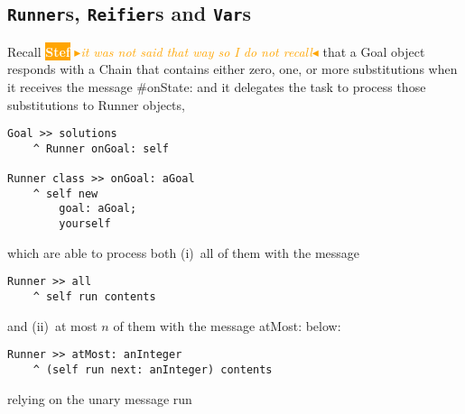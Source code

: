 \documentclass[a4paper,11pt]{article}
\newcommand{\nb}[3]{
		{\colorbox{#2}{\bfseries\sffamily\scriptsize\textcolor{white}{#1}}}
		{\textcolor{#2}{\sf\small$\blacktriangleright$\textit{#3}$\blacktriangleleft$}}}
\newcommand{\nb}[3]{}
\newcommand{\sd}[1]{\nb{Stef}{orange}{#1}}
\newcommand{\ct}[1]{{\textsf{#1}}\xspace}
\begin{document}
\subsection{\texttt{Runner}s, \texttt{Reifier}s and \texttt{Var}s}

Recall \sd{it was not said that way so I do not recall} that a \ct{Goal} object responds with a \ct{Chain} that contains either zero,
one, or more substitutions when it receives the message \ct{\#onState:} and it
delegates the task to process those substitutions to \ct{Runner} objects,

\begin{verbatim}
Goal >> solutions
    ^ Runner onGoal: self

Runner class >> onGoal: aGoal
    ^ self new
        goal: aGoal;
        yourself
\end{verbatim}
which are able to process both (i)~all of them with the message
\begin{verbatim}
Runner >> all
    ^ self run contents
\end{verbatim}
and (ii)~at most $n$ of them with the message \ct{atMost:} below: 
\begin{verbatim}
Runner >> atMost: anInteger
    ^ (self run next: anInteger) contents
\end{verbatim}
relying on the unary message \ct{run}
\end{document}
